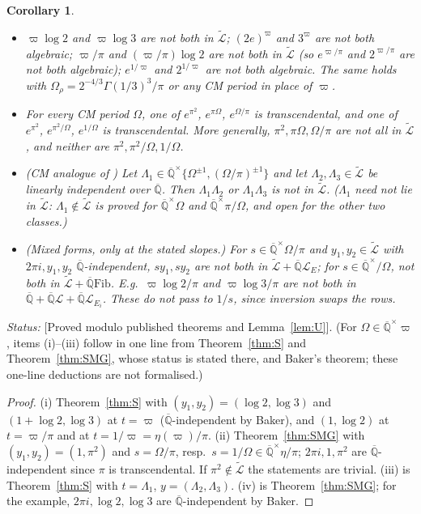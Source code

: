 \documentclass[11pt]{amsart}
\newtheorem{corollary}[theorem]{Corollary}
\theoremstyle{definition}
\newcommand{\Qb}{\overline{\mathbb{Q}}}
\newcommand{\Lg}{\mathcal{L}}
\newcommand{\Lt}{\widetilde{\mathcal{L}}}
\newcommand{\vp}{\varpi}
\newcommand{\Fib}{\mathrm{Fib}}
\newcommand{\lab}[1]{\textup{[#1]}}
\newcommand{\LabC}{\lab{Proved modulo published theorems and Lemma~\ref{lem:U}}}
\newcommand{\Status}{\noindent\emph{Status:} }
\begin{document}
\begin{corollary}\label{cor:S}
\begin{itemize}
\item[(i)] $\vp\log2$ and $\vp\log3$ are not both in $\Lt$; $(2e)^{\vp}$ and $3^{\vp}$ are not both algebraic;
$\vp/\pi$ and $(\vp/\pi)\log2$ are not both in $\Lt$ (so $e^{\vp/\pi}$ and $2^{\vp/\pi}$ are not both algebraic); $e^{1/\vp}$
and $2^{1/\vp}$ are not both algebraic. The same holds with $\Omega_\rho=2^{-4/3}\Gamma(1/3)^3/\pi$ or any CM period in place
of $\vp$.
\item[(ii)] For every CM period $\Omega$, one of $e^{\pi^2}$, $e^{\pi\Omega}$, $e^{\Omega/\pi}$ is transcendental, and one of
$e^{\pi^2}$, $e^{\pi^2/\Omega}$, $e^{1/\Omega}$ is transcendental. More generally, $\pi^2,\pi\Omega,\Omega/\pi$ are not all in
$\Lt$, and neither are $\pi^2,\pi^2/\Omega,1/\Omega$.
\item[(iii)] \textup{(CM analogue of \cite[Cor.~1.3]{W05b})} Let $\Lambda_1\in\Qb^\times\{\Omega^{\pm1},(\Omega/\pi)^{\pm1}\}$
and let $\Lambda_2,\Lambda_3\in\Lt$ be linearly independent over $\Qb$. Then $\Lambda_1\Lambda_2$ or $\Lambda_1\Lambda_3$ is
not in $\Lt$. ($\Lambda_1$ need not lie in $\Lt$: $\Lambda_1\notin\Lt$ is proved for $\Qb^\times\Omega$ and $\Qb^\times\pi/\Omega$,
and open for the other two classes.)
\item[(iv)] \textup{(Mixed forms, only at the stated slopes.)} For $s\in\Qb^\times\Omega/\pi$ and $y_1,y_2\in\Lt$ with
$2\pi i,y_1,y_2$ $\Qb$-independent, $sy_1,sy_2$ are not both in $\Lt+\Qb\Lg_E$; for $s\in\Qb^\times/\Omega$, not both in
$\Lt+\Qb\Fib$. E.g.\ $\vp\log2/\pi$ and $\vp\log3/\pi$ are not both in $\Qb+\Qb\Lg+\Qb\Lg_{E_i}$. These do not pass to $1/s$,
since inversion swaps the rows.
\end{itemize}
\end{corollary}


\Status \LabC. (For $\Omega\in\Qb^\times\vp$, items (i)--(iii) follow in one line from Theorem~\ref{thm:S} and
Theorem~\ref{thm:SMG}, whose status is stated there, and Baker's theorem; these one-line deductions are not formalised.)

\begin{proof}
(i) Theorem~\ref{thm:S} with $(y_1,y_2)=(\log2,\log3)$ and $(1+\log2,\log3)$ at $t=\vp$ ($\Qb$-independent by Baker), and
$(1,\log2)$ at $t=\vp/\pi$ and at $t=1/\vp=\eta(\vp)/\pi$. (ii) Theorem~\ref{thm:SMG} with $(y_1,y_2)=(1,\pi^2)$ and $s=\Omega/\pi$,
resp.\ $s=1/\Omega\in\Qb^\times\eta/\pi$; $2\pi i,1,\pi^2$ are $\Qb$-independent since $\pi$ is transcendental. If
$\pi^2\notin\Lt$ the statements are trivial. (iii) is Theorem~\ref{thm:S} with $t=\Lambda_1$, $y=(\Lambda_2,\Lambda_3)$.
(iv) is Theorem~\ref{thm:SMG}; for the example, $2\pi i,\log2,\log3$ are $\Qb$-independent by Baker.
\end{proof}
\end{document}
